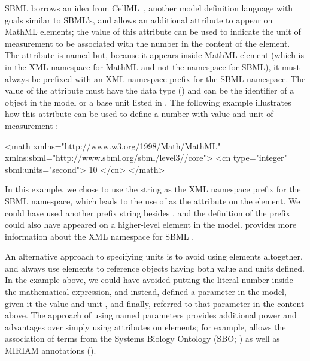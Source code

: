 SBML borrows an idea from CellML~\citep{hedley:2001b}, another
model definition language with goals similar to SBML's, and allows
an additional attribute to appear on MathML  elements;
the value of this attribute can be used to indicate the unit of
measurement to be associated with the number in the content of the
 element.  The attribute is named  but,
because it appears inside MathML element (which is in the XML
namespace for MathML and not the namespace for SBML), it must
always be prefixed with an XML namespace prefix for the SBML
\thisLV namespace.  The value of the attribute must have the data
type  () and can
be the identifier of a \UnitDefinition object in the model or a
base unit listed in .  The following
example illustrates how this attribute can be used to define a
number with value  and unit of measurement :
\reltwo{\vspace*{0.25ex}}
\begin{example}
<math xmlns="http://www.w3.org/1998/Math/MathML"
      xmlns:sbml="http://www.sbml.org/sbml/level3//core">
    <cn type="integer" sbml:units="second"> 10 </cn>
</math>
\end{example} 
\reltwo{\vspace*{0.25ex}}

In this example, we chose to use the string  as the XML
namespace prefix for the SBML \thisLV namespace, which leads to
the use of  as the attribute on the 
element.  We could have used another prefix string besides
, and the definition of the prefix could also have
appeared on a higher-level element in the model.
 provides more information about the XML
namespace for SBML \thisLV.

An alternative approach to specifying units is to avoid using
 elements altogether, and always use  elements
to reference \Parameter objects having both value and units
defined.  In the example above, we could have avoided putting the
literal number  inside the mathematical expression, and
instead, defined a parameter in the model, given it the value
 and unit , and finally, referred to that
parameter in the  content above.  The approach of
using named parameters provides additional power and advantages
over simply using  attributes on 
elements; for example, \Parameter allows the association of terms
from the Systems Biology Ontology (SBO; ) as
well as MIRIAM annotations ().

